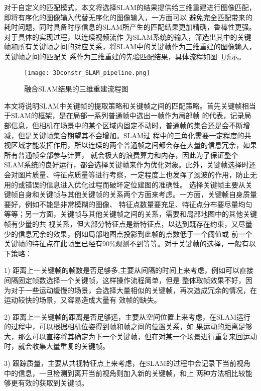 对于自定义的匹配模式，本文将选择SLAM的结果提供给三维重建进行图像匹配，即将有序化的图像输入代替无序化的图像输入，一方面可以
避免完全匹配带来的耗时问题，同时具备时序信息的SLAM所产生的匹配结果更加精确，鲁棒性更强。对于具体的实现过程，以连续视频流作
为SLAM系统的输入，筛选出其中的关键帧和所有关键帧之间的对应关系，将SLAM中的关键帧作为三维重建的图像输入，关键帧之间的匹配关
系作为三维重建的先验匹配结果，具体流程如图~\ref{fig:3Dconstr_SLAM_pipeline}所示。
\begin{figure}[H] %
  \centering
  \texttt{[image: 3Dconstr\_SLAM\_pipeline.png]}
  \caption{融合SLAM结果的三维重建流程图}
  \label{fig:3Dconstr_SLAM_pipeline}
\end{figure}
本文将说明SLAM中关键帧的提取策略和关键帧之间的匹配策略。首先关键帧相当于SLAM的框架，是在局部一系列普通帧中选出一帧作为局部帧
的代表，记录局部信息，但相机在场景中的某个区域内固定不动时，普通帧的集合还是会不断增减，但是关键帧集合期望其不会增加。SLAM过
程中的三角化需要一定程度的共视区域才能发挥作用，所以连续的两个普通帧之间都会存在大量的信息冗余，如果所有普通帧全部参与计算，
就会极大的浪费算力和内存，因此为了保证整个SLAM系统的良好运行，都会选择关键帧来作为优化对象。此外，关键帧选择时还会对图片质量、特征点质量等进行考察，一定程度上也发挥了滤波的作用，防止无用的或错误的信息进入优化过程而破坏定位建图的准确性。
选择关键帧主要从关键帧自身和关键帧与其他关键帧的关系两个方面来考虑。一方面，关键帧自身质量要好，例如不能是非常模糊的图像、
特征点数量要充足、特征点分布要尽量均匀等等；另一方面，关键帧与其他关键帧之间的关系，需要和局部地图中的其他关键帧有少量的共
视关系，但大部分特征点是新特征点，以达到既存在约束，又尽量少的信息冗余的效果，例如局部地图点投影到此帧的点数低于一个阈值或
前一个关键帧的特征点在此帧里已经有90$\%$观测不到等等。对于关键帧的选择，一般有以下策略：

1)	距离上一关键帧的帧数是否足够多,主要从间隔的时间上来考虑，例如可以直接间隔固定帧数选择一个关键帧，这样操作流程简单，但是
整体取帧效果不好，因为对于一些运动缓慢的场景，会选择大量相似的关键帧，再次造成冗余的情况，在运动较快的场景，又容易造成大量有
效帧的缺失。

2)	距离上一关键帧的距离是否足够远，主要从空间位置上来考虑，在SLAM运行的过程中，可以根据相机位姿得到帧和帧之间的位置关系，如
果运动的距离足够大，那么可以直接将其确定为下一个关键帧，但在对某一个场景进行重复来回运动时，就会收集大量重复的关键帧。

3)	跟踪质量，主要从共视特征点上来考虑，在SLAM的过程中会记录下当前视角中的信息，一旦检测到离开当前视角则加入新的关键帧，和上
两种方法相比较能够更有效的获取到关键帧。

